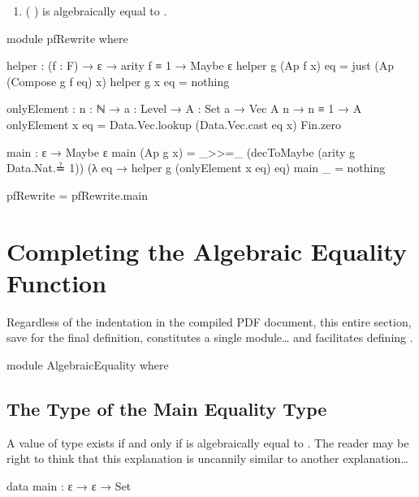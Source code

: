 \documentclass{report}
\begin{document}
\begin{enumerate}
  \item {} \AgdaSymbol(   \AgdaSymbol)  is algebraically equal to .\label{enum:pfRewriteEquality}
\end{enumerate}

\begin{code}
  module pfRewrite where

    helper : (f : F) → ε → arity f ≡ 1 → Maybe ε
    helper g (Ap f x) eq = just (Ap (Compose g f eq) x)
    helper g x eq = nothing

    onlyElement : {n : ℕ} →
                  {a : Level} →
                  {A : Set a} →
                  Vec A n →
                  n ≡ 1 →
                  A
    onlyElement x eq = Data.Vec.lookup (Data.Vec.cast eq x) Fin.zero

    main : ε → Maybe ε
    main (Ap g x) = _>>=_ (decToMaybe (arity g Data.Nat.≟ 1))
                          (λ eq → helper g (onlyElement x eq) eq)
    main _ = nothing

  pfRewrite = pfRewrite.main
\end{code}

\section{Completing the Algebraic Equality Function}
Regardless of the indentation in the compiled PDF document, this entire section, save for the final definition, constitutes a single module\ldots{} and facilitates defining .

\begin{code}
  module AlgebraicEquality where
\end{code}

\subsection{The Type of the Main Equality Type}
A value of type    exists if and only if  is algebraically equal to .  The reader may be right to think that this explanation is uncannily similar to another explanation\ldots{}

\begin{code}
    data main : ε → ε → Set
\end{code}
\end{document}
